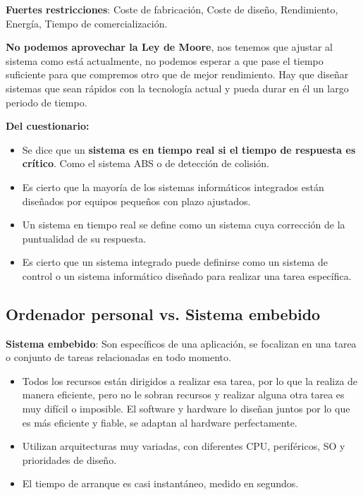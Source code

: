 \documentclass[12pt, twoside, openright]{report} %
\begin{document}
\textbf{Fuertes restricciones}: Coste de fabricación, Coste de diseño, Rendimiento, Energía, Tiempo de comercialización.

\textbf{No podemos aprovechar la Ley de Moore}, nos tenemos que ajustar
al sistema como está actualmente, no podemos esperar a que pase el
tiempo suficiente para que compremos otro que de mejor rendimiento. Hay
que diseñar sistemas que sean rápidos con la tecnología actual y pueda
durar en él un largo periodo de tiempo.

\textbf{Del cuestionario:}

\begin{itemize}
	\item Se dice que un \textbf{sistema es en tiempo real si el tiempo de
		      respuesta es crítico}. Como el sistema ABS o de detección de colisión.
	\item Es cierto que la mayoría de los sistemas informáticos integrados están
	      diseñados por equipos pequeños con plazo ajustados.
	\item Un sistema en tiempo real se define como un sistema cuya corrección de
	      la puntualidad de su respuesta.
	\item Es cierto que un sistema integrado puede definirse como un sistema de
	      control o un sistema informático diseñado para realizar una tarea
	      específica.
\end{itemize}

\subsection{Ordenador personal vs. Sistema
	embebido}

\textbf{Sistema embebido}: Son específicos de una aplicación, se
focalizan en una tarea o conjunto de tareas relacionadas en todo
momento.

\begin{itemize}
	\item Todos los recursos están dirigidos a realizar esa tarea, por lo que la
	      realiza de manera eficiente, pero no le sobran recursos y realizar alguna otra tarea es
	      muy difícil o imposible. El software y hardware lo diseñan juntos por
	      lo que es más eficiente y fiable, se adaptan al hardware
	      perfectamente.
	\item Utilizan arquitecturas muy variadas, con diferentes CPU, periféricos,
	      SO y prioridades de diseño.
	\item El tiempo de arranque es casi instantáneo, medido en segundos.
\end{itemize}
\end{document}
